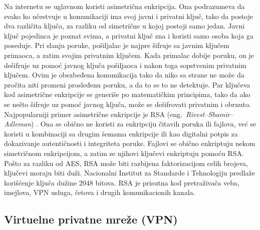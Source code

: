 \documentclass[a4paper]{article}
\begin{document}
\par Na internetu se uglavnom koristi asimetrična enkripcija. Ona podrazumeva da svako ko učestvuje u komunikaciji ima svoj javni i privatni ključ, tako da postoje dva različita ključa, za razliku od simetrične u kojoj postoji samo jedan. Javni ključ pojedinca je poznat svima, a privatni ključ zna i koristi samo osoba koja ga poseduje. Pri slanju poruke, pošiljalac je najpre šifruje sa javnim ključem primaoca, a zatim svojim privatnim ključem. Kada primalac dobije poruku, on je dešifruje uz pomoć javnog ključa pošiljaoca i nakon toga sopstvenim privatnim ključem. Ovim je obezbeđena komunikacija tako da niko sa strane ne može da pročita niti promeni prosleđenu poruku, a da to se to ne detektuje. Par ključeva kod asimetrične enkripcije se generiše po matematičkim principima, tako da ako se nešto šifruje uz pomoć javnog ključa, može se dešifrovati privatnim i obrnuto. Najpopularniji primer asimetrične enkripcije je RSA (eng.~{\em Rivest–Shamir–Adleman}) \cite{rsa}. Ona se obično ne koristi za enkripciju čitavih poruka ili fajlova, već se koristi u kombinaciji sa drugim šemama enkripcije ili kao digitalni potpis za dokazivanje autentičnosti i integriteta poruke. Fajlovi se obično enkriptuju nekom simetričnom enkripcijom, a zatim se njihovi ključevi enkriptuju pomoću RSA. Pošto za razliku od AES, RSA može biti razbijena faktorizacijom celih brojeva, ključevi moraju biti duži. Nacionalni Institut za Standarde i Tehnologiju predlaže korišćenje ključa dužine 2048 bitova. RSA je prisutna kod pretraživača veba, imejlova, VPN usluga, četova i drugih komunikacionih kanala. 


\subsection{Virtuelne privatne mreže (VPN)}
\label{subsec:vpn}
\end{document}
